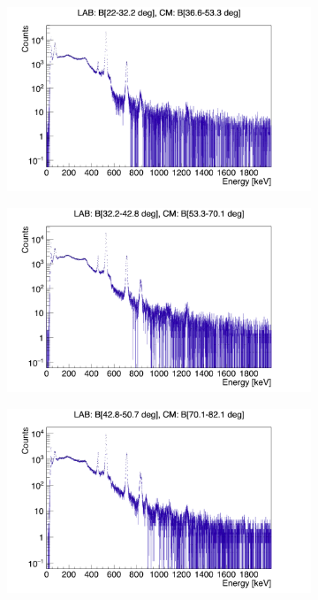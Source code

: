 \documentclass[twoside,english]{uiofysmaster/uiofysmaster}
\begin{document}
\begin{figure}[htb!]
	\centering
	\begin{subfigure}[t]{0.49\textwidth}
		\centering
		\includegraphics[width=\textwidth]{../Plots/plotting/Projections-combined/B_dcB_x-ProjY_2-4_combined}
		\caption{}
	\end{subfigure}
	\hfill
	\begin{subfigure}[t]{0.49\textwidth}
		\centering
		\includegraphics[width=\textwidth]{../Plots/plotting/Projections-combined/B_dcB_x-ProjY_5-8_combined}
		\caption{}
	\end{subfigure}
	\begin{subfigure}[t]{0.49\textwidth}
		\centering
		\includegraphics[width=\textwidth]{../Plots/plotting/Projections-combined/B_dcB_x-ProjY_9-12_combined}

\end{subfigure}
\end{figure}
\end{document}
